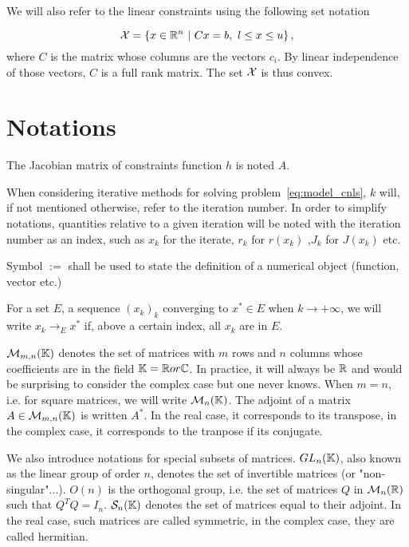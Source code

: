 \documentclass[10pt]{article}
\numberwithin{equation}{section}
\begin{document}
	We will also refer to the linear constraints using the following set notation 
	
	\begin{equation}
		\label{eq:linear_constraints}
		{\mathcal{X}} = \left\{ x \in {\mathbb{R}}^n \ | \ Cx=b,\ l \le x \le u\right\},
	\end{equation}
	where $C$ is the matrix whose columns are the vectors $c_i$. By linear independence of those vectors, $C$ is a full rank matrix. The set ${\mathcal{X}}$ is thus convex.
	
	\section*{Notations}
	 
	
	The Jacobian matrix of constraints function $h$ is noted $A$.
	
	When considering iterative methods for solving problem~\eqref{eq:model_cnls}, $k$ will, if not mentioned otherwise, refer to the iteration number. In order to simplify notations, quantities relative to a given iteration will be noted with the iteration number as an index, such as $x_k$ for the iterate, $r_k$ for $r(x_k)$ ,$J_k$ for $J(x_k)$ etc.
	
	Symbol $:=$ shall be used to state the definition of a numerical object (function, vector etc.)
	
	For a set $E$, a sequence $(x_k)_k$ converging to $x^* \in E$ when $k\to+\infty$, we will write $x_k \to_E x^*$ if, above a certain index, all $x_k$ are in $E$. 
	
	${\mathcal{M}}_{m,n}({\mathbb{K}})$ denotes the set of matrices with $m$ rows and $n$ columns whose coefficients are in the field ${\mathbb{K}} = {\mathbb{R}} or {\mathbb{C}}$. In practice, it will always be ${\mathbb{R}}$ and would be surprising to consider the complex case but one never knows. When $m=n$, i.e. for square matrices, we will write ${\mathcal{M}}_n({\mathbb{K}})$. The adjoint of a matrix $A\in {\mathcal{M}}_{m,n}({\mathbb{K}})$ is written $A^*$. In the real case, it corresponds to its transpose, in the complex case, it corresponds to the tranpose if its conjugate. 
	
	We also introduce notations for special subsets of matrices. $GL_n({\mathbb{K}})$, also known as the linear group of order $n$, denotes the set of invertible matrices (or "non-singular"...). $O(n)$ is the orthogonal group, i.e. the set of matrices $Q$ in ${\mathcal{M}}_n({\mathbb{R}})$ such that $Q^TQ=I_n$. ${\mathcal{S}}_n({\mathbb{K}})$ denotes the set of matrices equal to their adjoint. In the real case, such matrices are called symmetric, in the complex case, they are called hermitian.  
	
\end{document}
